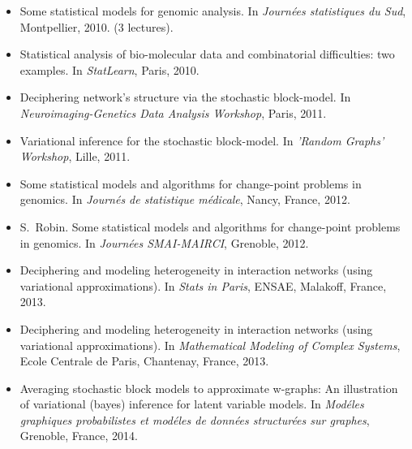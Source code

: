 \begin{itemize}

\item
\newblock Some statistical models for genomic analysis.
\newblock In {\em Journ\'ees statistiques du Sud}, Montpellier, 2010.
\newblock (3 lectures).

\item
\newblock Statistical analysis of bio-molecular data and combinatorial
  difficulties: two examples.
\newblock In {\em StatLearn}, Paris, 2010.

\item
\newblock Deciphering network's structure via the stochastic block-model.
\newblock In {\em Neuroimaging-Genetics Data Analysis Workshop}, Paris, 2011.

\item
\newblock Variational inference for the stochastic block-model.
\newblock In {\em 'Random Graphs' Workshop}, Lille, 2011.

\item
\newblock Some statistical models and algorithms for change-point problems in
  genomics.
\newblock In {\em Journ\'es de statistique m\'edicale}, Nancy, France, 2012.
\item
S.~Robin.
\newblock Some statistical models and algorithms for change-point problems in
  genomics.
\newblock In {\em Journ\'ees SMAI-MAIRCI}, Grenoble, 2012.

\item
\newblock Deciphering and modeling heterogeneity in interaction networks (using
  variational approximations).
\newblock In {\em Stats in {P}aris}, ENSAE, Malakoff, France, 2013.

\item
\newblock Deciphering and modeling heterogeneity in interaction networks (using
  variational approximations).
\newblock In {\em Mathematical Modeling of Complex Systems}, Ecole Centrale de
  Paris, Chantenay, France, 2013.

\item
\newblock Averaging stochastic block models to approximate w-graphs: An
  illustration of variational (bayes) inference for latent variable models.
\newblock In {\em Mod\'eles graphiques probabilistes et mod\'eles de donn\'ees
  structur\'ees sur graphes}, Grenoble, France, 2014.

\end{itemize}
